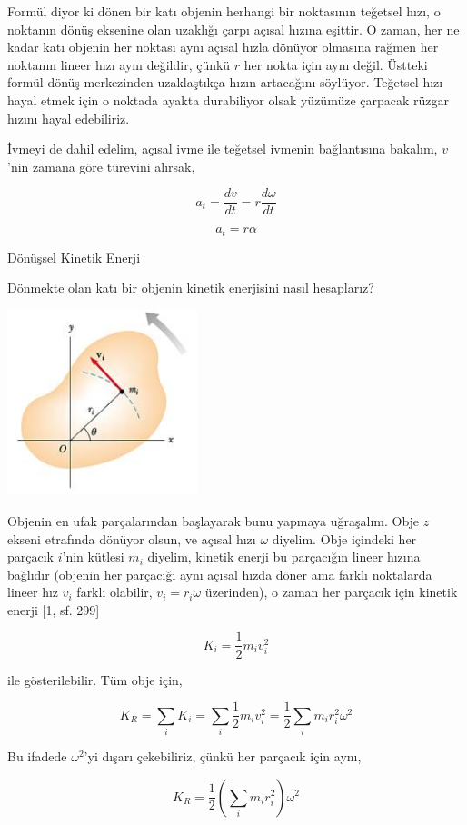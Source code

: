 \documentclass[12pt,fleqn]{article}\usepackage{../../common}
\begin{document}
Formül diyor ki dönen bir katı objenin herhangi bir noktasının teğetsel
hızı, o noktanın dönüş eksenine olan uzaklığı çarpı açısal hızına
eşittir. O zaman, her ne kadar katı objenin her noktası aynı açısal hızla
dönüyor olmasına rağmen her noktanın lineer hızı aynı değildir, çünkü $r$
her nokta için aynı değil. Üstteki formül dönüş merkezinden uzaklaştıkça
hızın artacağını söylüyor. Teğetsel hızı hayal etmek için o noktada ayakta
durabiliyor olsak yüzümüze çarpacak rüzgar hızını hayal edebiliriz. 

İvmeyi de dahil edelim, açısal ivme ile teğetsel ivmenin bağlantısına
bakalım, $v$'nin zamana göre türevini alırsak,

$$
a_t = \frac{dv}{dt} = r \frac{d\omega}{dt}
$$

$$
a_t = r \alpha
$$

Dönüşsel Kinetik Enerji

Dönmekte olan katı bir objenin kinetik enerjisini nasıl hesaplarız? 

\includegraphics[width=15em]{phy_005_basics_02_10.jpg}

Objenin en ufak parçalarından başlayarak bunu yapmaya uğraşalım. Obje
$z$ ekseni etrafında dönüyor olsun, ve açısal hızı $\omega$
diyelim. Obje içindeki her parçacık $i$'nin kütlesi $m_i$ diyelim,
kinetik enerji bu parçacığın lineer hızına bağlıdır (objenin her
parçacığı aynı açısal hızda döner ama farklı noktalarda lineer hız
$v_i$ farklı olabilir, $v_i = r_i \omega$ üzerinden), o zaman her
parçacık için kinetik enerji [1, sf. 299]

$$
K_i = \frac{1}{2} m_i v_i^2
$$

ile gösterilebilir. Tüm obje için, 

$$
K_R = \sum_i K_i =
\sum_i \frac{1}{2} m_i v_i^2 =
\frac{1}{2} \sum_i m_i r_i^2 \omega^2
$$

Bu ifadede $\omega^2$'yi dışarı çekebiliriz, çünkü her parçacık için aynı,

$$
K_R = \frac{1}{2} \left( \sum_i m_i r_i^2 \right) \omega^2
$$
\end{document}
